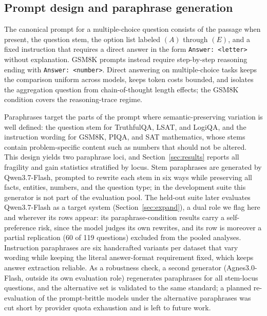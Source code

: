 \subsection{Prompt design and paraphrase generation}

The canonical prompt for a multiple-choice question consists of the passage when present, the question stem, the option list labeled $(A)$ through $(E)$, and a fixed instruction that requires a direct answer in the form \texttt{Answer: <letter>} without explanation. GSM8K prompts instead require step-by-step reasoning ending with \texttt{Answer: <number>}. Direct answering on multiple-choice tasks keeps the comparison uniform across models, keeps token costs bounded, and isolates the aggregation question from chain-of-thought length effects; the GSM8K condition covers the reasoning-trace regime.

Paraphrases target the parts of the prompt where semantic-preserving variation is well defined: the question stem for TruthfulQA, LSAT, and LogiQA, and the instruction wording for GSM8K, PIQA, and SAT mathematics, whose stems contain problem-specific content such as numbers that should not be altered. This design yields two paraphrase loci, and Section~\ref{sec:results} reports all fragility and gain statistics stratified by locus. Stem paraphrases are generated by Qwen3.7-Flash, prompted to rewrite each stem in six ways while preserving all facts, entities, numbers, and the question type; in the development suite this generator is not part of the evaluation pool. The held-out suite later evaluates Qwen3.7-Flash as a target system (Section~\ref{sec:expand}), a dual role we flag here and wherever its rows appear: its paraphrase-condition results carry a self-preference risk, since the model judges its own rewrites, and its row is moreover a partial replication (60 of 119 questions) excluded from the pooled analyses. Instruction paraphrases are six handcrafted variants per dataset that vary wording while keeping the literal answer-format requirement fixed, which keeps answer extraction reliable. As a robustness check, a second generator (Agnes3.0-Flash, outside its own evaluation role) regenerates paraphrases for all stem-locus questions, and the alternative set is validated to the same standard; a planned re-evaluation of the prompt-brittle models under the alternative paraphrases was cut short by provider quota exhaustion and is left to future work.

